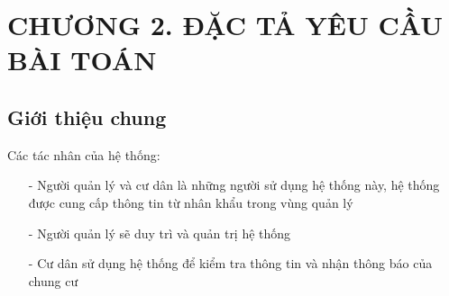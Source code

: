 \documentclass{article}
\begin{document}


\section*{CHƯƠNG 2. ĐẶC TẢ YÊU CẦU BÀI TOÁN}
\setcounter{section}{2}
\setcounter{subsection}{0}
\subsection{Giới thiệu chung}
Các tác nhân của hệ thống: 
\begin{itemize}
    \item[-] Người quản lý và cư dân là những người sử dụng hệ thống này, hệ thống được cung cấp thông tin từ nhân khẩu trong vùng quản lý
    \item[-] Người quản lý sẽ duy trì và quản trị hệ thống 
    \item[-] Cư dân sử dụng hệ thống để kiểm tra thông tin và nhận thông báo của chung cư
\end{itemize}
\end{document}
